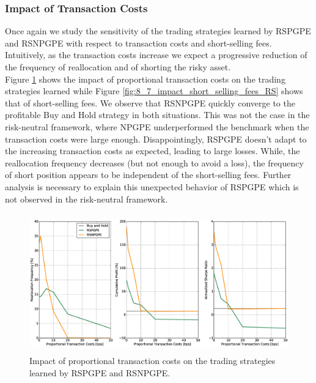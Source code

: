 \subsubsection{Impact of Transaction Costs}
Once again we study the sensitivity of the trading strategies learned by \gls{RSPGPE} and \gls{RSNPGPE} with respect to transaction costs and short-selling fees. Intuitively, as the transaction costs increase we expect a progressive reduction of the frequency of reallocation and of shorting the risky asset.\\
Figure \ref{fig:8_6_impact_transaction_costs_RS} shows the impact of proportional transaction costs on the trading strategies learned while Figure \ref{fig:8_7_impact_short_selling_fees_RS} shows that of short-selling fees. We observe that \gls{RSNPGPE} quickly converge to the profitable Buy and Hold strategy in both situations. This was not the case in the risk-neutral framework, where \gls{NPGPE} underperformed the benchmark when the transaction costs were large enough. Disappointingly, \gls{RSPGPE} doesn't adapt to the increasing transaction costs as expected, leading to large losses. While, the reallocation frequency decreases (but not enough to avoid a loss), the frequency of short position appears to be independent of the short-selling fees. Further analysis is necessary to explain this unexpected behavior of \gls{RSPGPE} which is not observed in the risk-neutral framework. 

\begin{figure}[t!]
\centering
\includegraphics[height=6cm,width=1\linewidth]{Images/8_6_impact_transaction_costs_RS}
\caption[Proportional transaction costs and risk-sensitive strategies]{Impact of proportional transaction costs on the trading strategies learned by RSPGPE and RSNPGPE.}
\label{fig:8_6_impact_transaction_costs_RS}
\end{figure}

